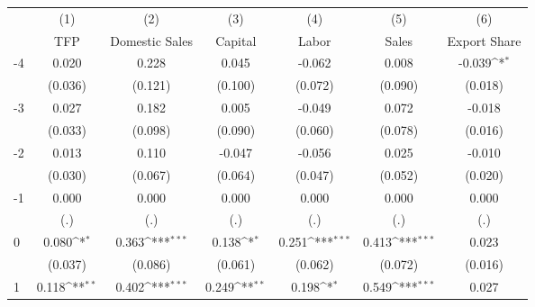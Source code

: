 {
\def\sym#1{\ifmmode^{#1}\else\(^{#1}\)\fi}
\begin{tabular}{l*{6}{c}}
\hline\hline
                    &\multicolumn{1}{c}{(1)}&\multicolumn{1}{c}{(2)}&\multicolumn{1}{c}{(3)}&\multicolumn{1}{c}{(4)}&\multicolumn{1}{c}{(5)}&\multicolumn{1}{c}{(6)}\\
                    &\multicolumn{1}{c}{TFP}&\multicolumn{1}{c}{Domestic Sales}&\multicolumn{1}{c}{Capital}&\multicolumn{1}{c}{Labor}&\multicolumn{1}{c}{Sales}&\multicolumn{1}{c}{Export Share}\\
\hline
-4                  &       0.020         &       0.228         &       0.045         &      -0.062         &       0.008         &      -0.039\sym{*}  \\
                    &     (0.036)         &     (0.121)         &     (0.100)         &     (0.072)         &     (0.090)         &     (0.018)         \\
[1em]
-3                  &       0.027         &       0.182         &       0.005         &      -0.049         &       0.072         &      -0.018         \\
                    &     (0.033)         &     (0.098)         &     (0.090)         &     (0.060)         &     (0.078)         &     (0.016)         \\
[1em]
-2                  &       0.013         &       0.110         &      -0.047         &      -0.056         &       0.025         &      -0.010         \\
                    &     (0.030)         &     (0.067)         &     (0.064)         &     (0.047)         &     (0.052)         &     (0.020)         \\
[1em]
-1                  &       0.000         &       0.000         &       0.000         &       0.000         &       0.000         &       0.000         \\
                    &         (.)         &         (.)         &         (.)         &         (.)         &         (.)         &         (.)         \\
[1em]
0                   &       0.080\sym{*}  &       0.363\sym{***}&       0.138\sym{*}  &       0.251\sym{***}&       0.413\sym{***}&       0.023         \\
                    &     (0.037)         &     (0.086)         &     (0.061)         &     (0.062)         &     (0.072)         &     (0.016)         \\
[1em]
1                   &       0.118\sym{**} &       0.402\sym{***}&       0.249\sym{**} &       0.198\sym{*}  &       0.549\sym{***}&       0.027         \\

\end{tabular}}
